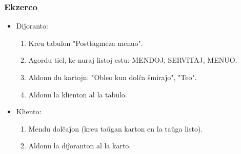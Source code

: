   \begin{frame}
    \frametitle{Ekzerco}

	\begin{itemize}
		\item Diĵoranto:
		\begin{enumerate}
			\item Kreu tabulon "Posttagmeza menuo".
			\item Agordu tiel, ke nuraj listoj estu: MENDOJ, SERVITAJ, MENUO.
			\item Aldonu du kartojn: "Obleo kun dolĉa ŝmiraĵo", "Teo".
			\item Aldonu la klienton al la tabulo.
		\end{enumerate}
			
		\item Kliento:
		\begin{enumerate}
			\item Mendu dolĉaĵon (kreu taŭgan karton en la taŭga listo).
			\item Aldonu la diĵoranton al la karto.
		\end{enumerate}    
	\end{itemize}
	    
  \end{frame}

